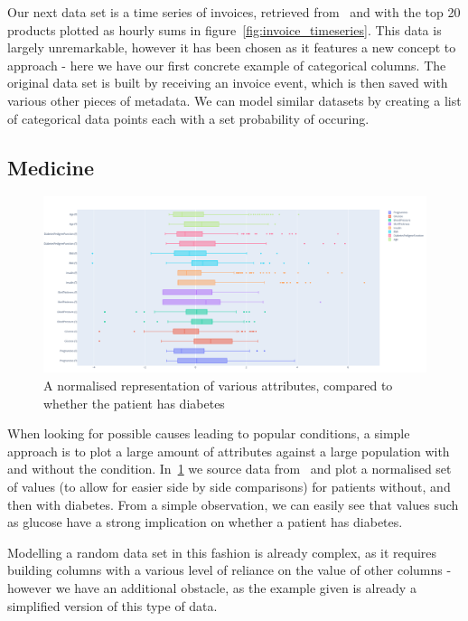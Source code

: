 Our next data set is a time series of invoices, retrieved from~\cite{UCIMLRepo} and with the top 20 products plotted
as hourly sums in figure~\ref{fig:invoice_timeseries}.
This data is largely unremarkable, however it has been chosen as it features a new concept to approach - here we have
our first concrete example of categorical columns.
The original data set is built by receiving an invoice event, which is then saved with various other pieces of metadata.
We can model similar datasets by creating a list of categorical data points each with a set probability of occuring.


\subsection{Medicine}

\begin{figure}[H]
    \centering
    \includegraphics[width=12cm]{figures/real_data_examples/diabetes_attributes}
    \caption{A normalised representation of various attributes, compared to whether the patient has diabetes}
    \label{fig:real_data_diabetes}
\end{figure}

When looking for possible causes leading to popular conditions, a simple approach is to plot a large amount of
attributes against a large population with and without the condition.
In~\ref{fig:real_data_diabetes} we source data from~\cite{KaggleDiabetes} and plot a normalised set of values (to allow
for easier side by side comparisons) for patients without, and then with diabetes.
From a simple observation, we can easily see that values such as glucose have a strong implication on whether a patient
has diabetes.

Modelling a random data set in this fashion is already complex, as it requires building columns with a various level of
reliance on the value of other columns - however we have an additional obstacle, as the example given is already a
simplified version of this type of data.

